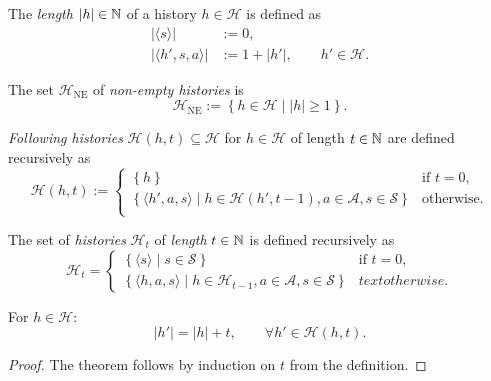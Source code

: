 \begin{definition} \label{def:hist-length}
The \emph{length} $|h|\in  \mathbb{N}$ of a history $h\in \mathcal{H}$ is defined as
\begin{align*}
|\langle s \rangle| &:= 0, \\
|\langle h', s, a \rangle| &:= 1 + |h'|, \qquad h' \in \mathcal{H}. 
\end{align*}
\end{definition}

\begin{definition} \label{def:hist-ne}
The set $\mathcal{H}_{\mathrm{NE}}$ of \emph{non-empty histories} is
\[
\mathcal{H}_{\mathrm{NE}} := \left\{ h \in \mathcal{H} \mid  |h| \ge 1 \right\}.
\]
\end{definition}

\begin{definition}\label{def:histories}
  \emph{Following histories} $\mathcal{H}(h,t) \subseteq \mathcal{H}$ for $h\in \mathcal{H}$ of length $t\in \mathbb{N}$ are defined recursively as
  \[
    \mathcal{H}(h,t) :=
    \begin{cases}
    \left\{  h \right\}  &\text{if } t = 0, \\
    \left\{  \langle h', a, s \rangle \mid h\in \mathcal{H}(h', t-1), a\in \mathcal{A}, s\in \mathcal{S}  \right\}  &\text{otherwise}. \\
    \end{cases}
  \]
\end{definition}

\begin{definition} \label{def:histories-horizon}
  The set of \emph{histories} $\mathcal{H}_{t}$ of \emph{length} $t \in \mathbb{N}$ is defined recursively as
  \[
    \mathcal{H}_t =
    \begin{cases}
      \left\{ \langle s \rangle \mid  s\in \mathcal{S} \right\} &\text{if } t = 0, \\
      \left\{ \langle h, a, s\rangle \mid h \in \mathcal{H}_{t-1}, a\in \mathcal{A}, s\in \mathcal{S} \right\} &text{otherwise}.
    \end{cases}
  \]
\end{definition}

\begin{theorem} \label{thm:hist-lenth-eq-horizon}
  For $h \in \mathcal{H}$:
  \[
   |h'| = |h| + t, \qquad \forall h'\in \mathcal{H}(h, t).
  \]
\end{theorem}
\begin{proof}
The theorem follows by induction on $t$ from the definition.  
\end{proof}

